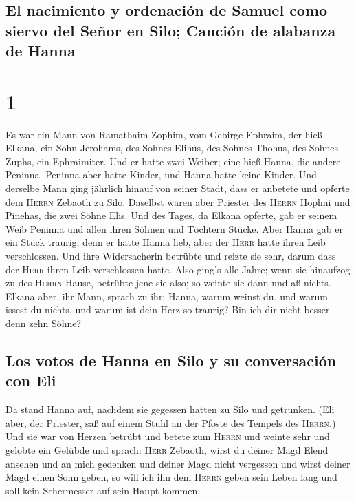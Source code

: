 \hypertarget{el-nacimiento-y-ordenaciuxf3n-de-samuel-como-siervo-del-seuxf1or-en-silo-canciuxf3n-de-alabanza-de-hanna}{%
\subsection{El nacimiento y ordenación de Samuel como siervo del Señor
en Silo; Canción de alabanza de
Hanna}\label{el-nacimiento-y-ordenaciuxf3n-de-samuel-como-siervo-del-seuxf1or-en-silo-canciuxf3n-de-alabanza-de-hanna}}

\hypertarget{section}{%
\section{1}\label{section}}

 Es war ein Mann von Ramathaim-Zophim, vom Gebirge
Ephraim, der hieß Elkana, ein Sohn Jerohams, des Sohnes Elihus, des
Sohnes Thohus, des Sohnes Zuphs, ein Ephraimiter.  Und er
hatte zwei Weiber; eine hieß Hanna, die andere Peninna. Peninna aber
hatte Kinder, und Hanna hatte keine Kinder.  Und derselbe
Mann ging jährlich hinauf von seiner Stadt, dass er anbetete und opferte
dem \textsc{Herrn} Zebaoth zu Silo. Daselbst waren aber Priester des
\textsc{Herrn} Hophni und Pinehas, die zwei Söhne Elis. 
Und des Tages, da Elkana opferte, gab er seinem Weib Peninna und allen
ihren Söhnen und Töchtern Stücke.  Aber Hanna gab er ein
Stück traurig; denn er hatte Hanna lieb, aber der \textsc{Herr} hatte
ihren Leib verschlossen.  Und ihre Widersacherin betrübte
und reizte sie sehr, darum dass der \textsc{Herr} ihren Leib
verschlossen hatte.  Also ging's alle Jahre; wenn sie
hinaufzog zu des \textsc{Herrn} Hause, betrübte jene sie also; so weinte
sie dann und aß nichts.  Elkana aber, ihr Mann, sprach zu
ihr: Hanna, warum weinst du, und warum issest du nichts, und warum ist
dein Herz so traurig? Bin ich dir nicht besser denn zehn Söhne?

\hypertarget{los-votos-de-hanna-en-silo-y-su-conversaciuxf3n-con-eli}{%
\subsection{Los votos de Hanna en Silo y su conversación con
Eli}\label{los-votos-de-hanna-en-silo-y-su-conversaciuxf3n-con-eli}}

 Da stand Hanna auf, nachdem sie gegessen hatten zu Silo
und getrunken. (Eli aber, der Priester, saß auf einem Stuhl an der
Pfoste des Tempels des \textsc{Herrn}.)  Und sie war von
Herzen betrübt und betete zum \textsc{Herrn} und weinte sehr
 und gelobte ein Gelübde und sprach: \textsc{Herr}
Zebaoth, wirst du deiner Magd Elend ansehen und an mich gedenken und
deiner Magd nicht vergessen und wirst deiner Magd einen Sohn geben, so
will ich ihn dem \textsc{Herrn} geben sein Leben lang und soll kein
Schermesser auf sein Haupt kommen.

